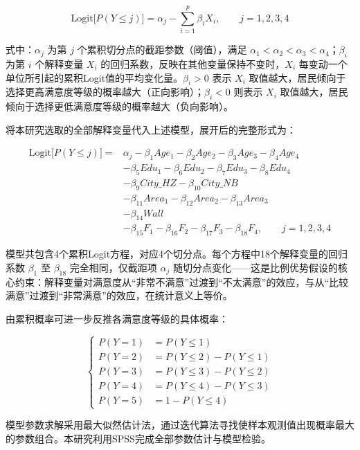 \begin{equation}
\mathrm{Logit}\bigl[P(Y\le j)\bigr]=\alpha_j-\sum_{i=1}^{p}\beta_i X_i,\qquad j=1,2,3,4
\end{equation}

式中：$\alpha_j$ 为第 $j$ 个累积切分点的截距参数（阈值），满足 $\alpha_1<\alpha_2<\alpha_3<\alpha_4$；$\beta_i$ 为第 $i$ 个解释变量 $X_i$ 的回归系数，反映在其他变量保持不变时，$X_i$ 每变动一个单位所引起的累积Logit值的平均变化量。$\beta_i>0$ 表示 $X_i$ 取值越大，居民倾向于选择更高满意度等级的概率越大（正向影响）；$\beta_i<0$ 则表示 $X_i$ 取值越大，居民倾向于选择更低满意度等级的概率越大（负向影响）。

将本研究选取的全部解释变量代入上述模型，展开后的完整形式为：

\begin{equation}
\begin{aligned}
\mathrm{Logit}\bigl[P(Y\le j)\bigr]={}&\alpha_j-\beta_1 Age_1-\beta_2 Age_2-\beta_3 Age_3-\beta_4 Age_4\\
&-\beta_5 Edu_1-\beta_6 Edu_2-\beta_7 Edu_3-\beta_8 Edu_4\\
&-\beta_9 City\_HZ-\beta_{10} City\_NB\\
&-\beta_{11} Area_1-\beta_{12} Area_2-\beta_{13} Area_3\\
&-\beta_{14} Wall\\
&-\beta_{15} F_1-\beta_{16} F_2-\beta_{17} F_3-\beta_{18} F_4,\qquad j=1,2,3,4
\end{aligned}
\end{equation}

模型共包含4个累积Logit方程，对应4个切分点。每个方程中18个解释变量的回归系数 $\beta_1$ 至 $\beta_{18}$ 完全相同，仅截距项 $\alpha_j$ 随切分点变化——这是比例优势假设的核心约束：解释变量对满意度从“非常不满意”过渡到“不太满意”的效应，与从“比较满意”过渡到“非常满意”的效应，在统计意义上等价。

由累积概率可进一步反推各满意度等级的具体概率：

\begin{equation}
\left\{\begin{aligned}
P(Y=1)&=P(Y\le1)\\
P(Y=2)&=P(Y\le2)-P(Y\le1)\\
P(Y=3)&=P(Y\le3)-P(Y\le2)\\
P(Y=4)&=P(Y\le4)-P(Y\le3)\\
P(Y=5)&=1-P(Y\le4)
\end{aligned}\right.
\end{equation}

模型参数求解采用最大似然估计法，通过迭代算法寻找使样本观测值出现概率最大的参数组合。本研究利用SPSS完成全部参数估计与模型检验。

